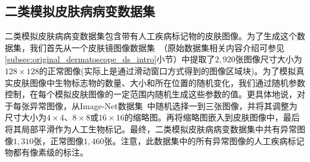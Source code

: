 \subsection{二类模拟皮肤病病变数据集}\label{subsec:bin_simulated_skin_ds}
二类模拟皮肤病病变数据集包含带有人工疾病标记物的皮肤图像。为了生成这个数据集，我们首先从一个皮肤镜图像数据集~\cite{codella2018skin}（原始数据集相关内容介绍可参见\ref{subsec:original_dermatoscope_ds_intro}小节）中提取了$2,920$张图像尺寸大小为$128\times128$的正常图像(实际上是通过滑动窗口方式得到的图像区域块)。为了模拟真实皮肤图像中生物标志物的数量、大小和所在位置的随机变化，我们通过随机参数控制，在每个模拟皮肤图像的一定范围内随机生成这些参数的值。更具体地说，对于每张异常图像，从Image-Net数据集~\cite{deng2009imagenet}中随机选择一到三张图像，并将其调整为尺寸大小为$4\times 4$、$8\times 8$或$16\times 16$的缩略图。再将缩略图嵌入到皮肤图像中，最后将其局部平滑作为人工生物标记。最终，二类模拟皮肤病病变数据集中共有异常图像$1,310$张，正常图像$1,460$张。注意，此数据集中的所有异常图像的人工疾病标记物都有像素级的标注。

